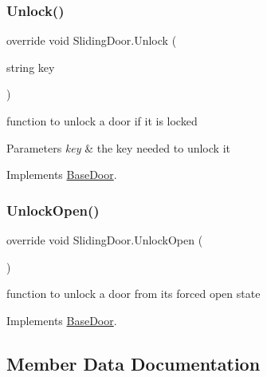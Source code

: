 \subsubsection{\texorpdfstring{Unlock()}{Unlock()}}
{\footnotesize\ttfamily override void Sliding\+Door.\+Unlock (\begin{DoxyParamCaption}\item[{string}]{key }\end{DoxyParamCaption})\hspace{0.3cm}{\ttfamily [virtual]}}



function to unlock a door if it is locked 


\begin{DoxyParams}{Parameters}
{\em key} & the key needed to unlock it\\
\hline
\end{DoxyParams}


Implements \mbox{\hyperlink{class_base_door_a1fe85317a4742aec4d03deb7c0d52fd2}{Base\+Door}}.

\mbox{\label{class_sliding_door_af3b93ba6356b95277be1913224ad1415}} 
\subsubsection{\texorpdfstring{Unlock\+Open()}{UnlockOpen()}}
{\footnotesize\ttfamily override void Sliding\+Door.\+Unlock\+Open (\begin{DoxyParamCaption}{ }\end{DoxyParamCaption})\hspace{0.3cm}{\ttfamily [virtual]}}



function to unlock a door from it\textquotesingle{}s forced open state 



Implements \mbox{\hyperlink{class_base_door_aae09177b7a5578ede6d44f758551684e}{Base\+Door}}.



\subsection{Member Data Documentation}
\mbox{\label{class_sliding_door_adfdf9df55e4882d083680e2cde5016c5}} 

